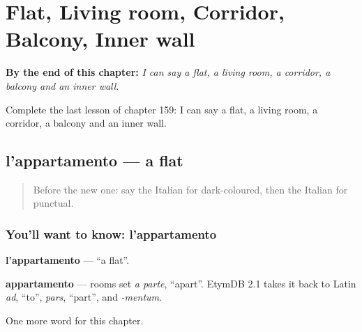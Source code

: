 
\chapter{Flat, Living room, Corridor, Balcony, Inner wall}
\label{ch:it-flat-living-room-corridor-balcony-inner-wall}

\begin{chapteropening}
\textbf{By the end of this chapter:} \emph{I can say a flat, a living room, a corridor, a balcony and an inner wall.}

Complete the last lesson of chapter 159: I can say a flat, a living room, a corridor, a balcony and an inner wall.
\end{chapteropening}

\section[l'appartamento]{l'appartamento — a flat}

\label{lesson:IT-C159-appartamento}



\begin{quote}
Before the new one: say the Italian for dark-coloured, then the Italian for punctual.
\end{quote}

\subsection*{You'll want to know: l'appartamento}
\textbf{l'appartamento} — \textquotedblleft{}a flat\textquotedblright{}.

\begin{cousinweb}
\textbf{appartamento} — rooms set \emph{a parte}, \textquotedblleft{}apart\textquotedblright{}. EtymDB 2.1 takes it back to Latin \emph{ad}, \textquotedblleft{}to\textquotedblright{}, \emph{pars}, \textquotedblleft{}part\textquotedblright{}, and \emph{-mentum}.
\end{cousinweb}

\begin{grammarlens}[title={What you've built}]
One more word for this chapter.
\end{grammarlens}


